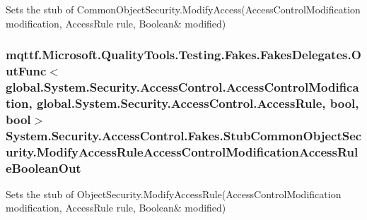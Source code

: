 Sets the stub of Common\-Object\-Security.\-Modify\-Access(Access\-Control\-Modification modification, Access\-Rule rule, Boolean\& modified)

\hypertarget{class_system_1_1_security_1_1_access_control_1_1_fakes_1_1_stub_common_object_security_aeecbf15f5ef875d79078dff9fbb8213d}{
\subsubsection[{Modify\-Access\-Rule\-Access\-Control\-Modification\-Access\-Rule\-Boolean\-Out}]{\setlength{\rightskip}{0pt plus 5cm}mqttf.\-Microsoft.\-Quality\-Tools.\-Testing.\-Fakes.\-Fakes\-Delegates.\-Out\-Func$<$global.\-System.\-Security.\-Access\-Control.\-Access\-Control\-Modification, global.\-System.\-Security.\-Access\-Control.\-Access\-Rule, bool, bool$>$ System.\-Security.\-Access\-Control.\-Fakes.\-Stub\-Common\-Object\-Security.\-Modify\-Access\-Rule\-Access\-Control\-Modification\-Access\-Rule\-Boolean\-Out}}\label{class_system_1_1_security_1_1_access_control_1_1_fakes_1_1_stub_common_object_security_aeecbf15f5ef875d79078dff9fbb8213d}


Sets the stub of Object\-Security.\-Modify\-Access\-Rule(Access\-Control\-Modification modification, Access\-Rule rule, Boolean\& modified)

